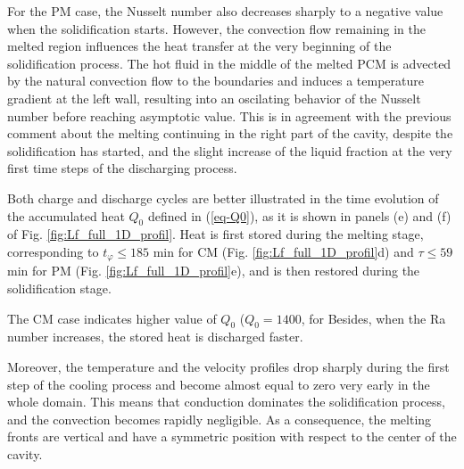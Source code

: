 For the PM case, the Nusselt number also decreases sharply to a negative value when the solidification starts.
However, the convection flow remaining in the melted region influences the heat transfer at the very beginning of the solidification process.
The hot fluid in the middle of the melted PCM is advected by the natural convection flow to the boundaries and induces a temperature gradient at the left wall, resulting into an oscilating behavior of the Nusselt number before reaching asymptotic value.
This is in agreement with the previous comment about the melting continuing in the right part of the cavity, despite the solidification has started, and the slight increase of the liquid fraction at the very first time steps of the discharging process.


Both charge and  discharge cycles are better illustrated in the time evolution of the accumulated heat $Q_0$ defined in (\ref{eq-Q0}), as it is shown in panels (e) and (f) of Fig.  \ref{fig:Lf_full_1D_profil}.
Heat is first stored during the melting stage, corresponding to $t_{\varphi} \leq 185$ min for CM (Fig. \ref{fig:Lf_full_1D_profil}d) and $\tau \leq 59$ min for PM (Fig. \ref{fig:Lf_full_1D_profil}e), and is then restored during the solidification stage.

\noindent The CM case indicates higher value of $Q_0$ ($Q_0 = 1400$, for  
Besides, when the Ra number increases, the stored heat is discharged faster.

\noindent Moreover, the temperature and the velocity profiles drop sharply during the first step of the cooling process and become almost equal to zero very early in the whole domain.
This means that conduction dominates the solidification process, and the convection becomes rapidly negligible.
As a consequence, the melting fronts are vertical and have a symmetric position with respect to the center of the cavity. \\



\newpage
